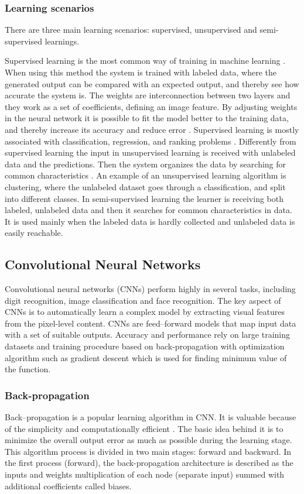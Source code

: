 \subsubsection{Learning scenarios}
There are three main learning scenarios: supervised, unsupervised and semi-supervised learnings.

Supervised learning is the most common way of training in machine learning \citep{LeCun2015}. When using this method the system is trained with labeled data, where the generated output can be compared with an expected output, and thereby see how accurate the system is. The weights are interconnection between two layers and they work as a set of coefficients, defining an image feature.\citep{Hameed2016} By adjusting weights in the neural network it is possible to fit the model better to the training data, and thereby increase its accuracy and reduce error \citep{LeCun2015}. Supervised learning is mostly associated with classification, regression, and ranking problems \citep{Mehryar2012}.
\noindent
Differently from supervised learning the input in unsupervised learning is received with unlabeled data and the predictions. Then the system organizes the data by searching for common characteristics \citep{Mehryar2012}. An example of an unsupervised learning algorithm is clustering, where the unlabeled dataset goes through a classification, and split into different classes.\citep{Goodfellow2016} 
\noindent
In semi-supervised learning the learner is receiving both labeled, unlabeled data and then it searches for common characteristics in data. It is used mainly when the labeled data is hardly collected and unlabeled data is easily reachable.\citep{Mehryar2012}

\subsection{Convolutional Neural Networks}
Convolutional neural networks (CNNs) perform highly in several tasks, including digit recognition, image classification and face recognition. The key aspect of CNNs is to automatically learn a complex model by extracting visual features from the pixel-level content.
CNNs are feed–forward models that map input data with a set of suitable outputs. 
Accuracy and performance rely on large training datasets and training procedure based on back-propagation with optimization algorithm such as gradient descent which is used for finding minimum value of the function.\citep{Acquarelli2017}

\subsubsection{Back-propagation}
Back–propagation is a popular learning algorithm in CNN. It is valuable because of the simplicity and computationally efficient \citep{Bengio2012}.
The basic idea behind it is to minimize the overall output error as much as possible during the learning stage. This algorithm process is divided in two main stages: forward and backward. In the first process (forward), the back-propagation architecture is described as  the inputs and weights multiplication of each node (separate input) summed with additional coefficients called biases.\citep{Hameed2016} 

